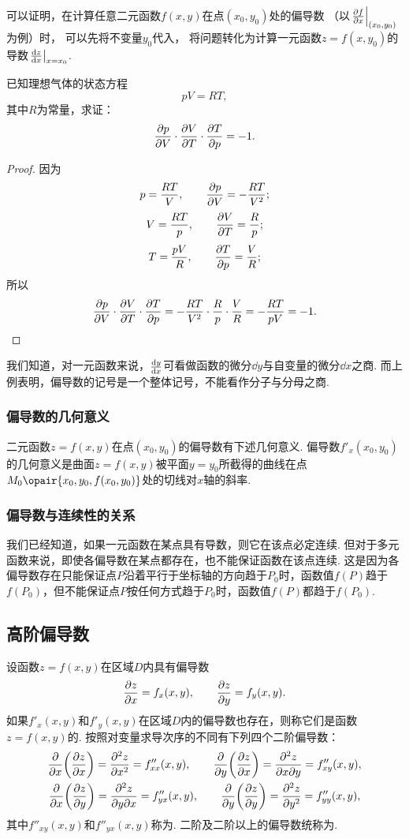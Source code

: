 可以证明，在计算任意二元函数\(f(x,y)\)在点\((x_0,y_0)\)处的偏导数
（以\(\eval{\pdv{f}{x}}_{(x_0,y_0)}\)为例）时，
可以先将不变量\(y_0\)代入，
将问题转化为计算一元函数\(z = f(x, y_0)\)的导数\(\eval{\dv{z}{x}}_{x=x_0}\).

\begin{example}
已知理想气体的状态方程\[
pV = RT,
\]其中\(R\)为常量，求证：\[
\pdv{p}{V} \cdot \pdv{V}{T} \cdot \pdv{T}{p} = -1.
\]
\begin{proof}
因为\[
p = \frac{RT}{V}, \qquad \pdv{p}{V} = -\frac{RT}{V^2};
\]\[
V = \frac{RT}{p}, \qquad \pdv{V}{T} = \frac{R}{p};
\]\[
T = \frac{pV}{R}, \qquad \pdv{T}{p} = \frac{V}{R};
\]所以\[
\pdv{p}{V} \cdot \pdv{V}{T} \cdot \pdv{T}{p}
= -\frac{RT}{V^2} \cdot \frac{R}{p} \cdot \frac{V}{R}
= -\frac{RT}{pV} = -1.
\qedhere
\]
\end{proof}
\end{example}

我们知道，对一元函数来说，\(\dv{y}{x}\)可看做函数的微分\(\dd{y}\)与自变量的微分\(\dd{x}\)之商.
而上例表明，偏导数的记号是一个整体记号，不能看作分子与分母之商.

\subsubsection{偏导数的几何意义}
二元函数\(z=f(x,y)\)在点\((x_0,y_0)\)的偏导数有下述几何意义.
偏导数\(f'_x(x_0,y_0)\)的几何意义是曲面\(z=f(x,y)\)被平面\(y=y_0\)所截得的曲线在点\(M_0\opair{x_0,y_0,f(x_0,y_0)}\)处的切线对\(x\)轴的斜率.

\subsubsection{偏导数与连续性的关系}
我们已经知道，如果一元函数在某点具有导数，则它在该点必定连续.
但对于多元函数来说，即使各偏导数在某点都存在，也不能保证函数在该点连续.
这是因为各偏导数存在只能保证点\(P\)沿着平行于坐标轴的方向趋于\(P_0\)时，函数值\(f(P)\)趋于\(f(P_0)\)，但不能保证点\(P\)按任何方式趋于\(P_0\)时，函数值\(f(P)\)都趋于\(f(P_0)\).

\subsection{高阶偏导数}
\begin{definition}
设函数\(z=f(x,y)\)在区域\(D\)内具有偏导数\[
\pdv{z}{x} = f_x(x,y), \qquad
\pdv{z}{y} = f_y(x,y).
\]如果\(f'_x(x,y)\)和\(f'_y(x,y)\)在区域\(D\)内的偏导数也存在，则称它们是函数\(z=f(x,y)\)的.
按照对变量求导次序的不同有下列四个二阶偏导数：
\begin{gather*}
\pdv{x}(\pdv{z}{x}) = \pdv[2]{z}{x} = f''_{xx}(x,y),
\qquad
\pdv{y}(\pdv{z}{x}) = \pdv{z}{x}{y} = f''_{xy}(x,y), \\
\pdv{x}(\pdv{z}{y}) = \pdv{z}{y}{x} = f''_{yx}(x,y),
\qquad
\pdv{y}(\pdv{z}{y}) = \pdv[2]{z}{y} = f''_{yy}(x,y),
\end{gather*}
其中\(f''_{xy}(x,y)\)和\(f''_{yx}(x,y)\)称为.
二阶及二阶以上的偏导数统称为.
\end{definition}

